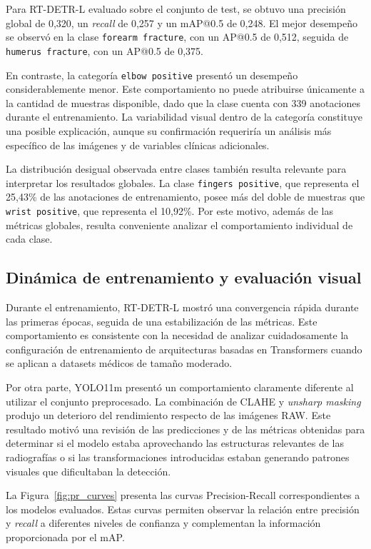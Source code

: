 \documentclass[conference]{IEEEtran}
\begin{document}
Para RT-DETR-L evaluado sobre el conjunto de test, se obtuvo una precisión global de 0,320, un \textit{recall} de 0,257 y un mAP@0.5 de 0,248. El mejor desempeño se observó en la clase \texttt{forearm fracture}, con un AP@0.5 de 0,512, seguida de \texttt{humerus fracture}, con un AP@0.5 de 0,375.

En contraste, la categoría \texttt{elbow positive} presentó un desempeño considerablemente menor. Este comportamiento no puede atribuirse únicamente a la cantidad de muestras disponible, dado que la clase cuenta con 339 anotaciones durante el entrenamiento. La variabilidad visual dentro de la categoría constituye una posible explicación, aunque su confirmación requeriría un análisis más específico de las imágenes y de variables clínicas adicionales.

La distribución desigual observada entre clases también resulta relevante para interpretar los resultados globales. La clase \texttt{fingers positive}, que representa el 25,43\% de las anotaciones de entrenamiento, posee más del doble de muestras que \texttt{wrist positive}, que representa el 10,92\%. Por este motivo, además de las métricas globales, resulta conveniente analizar el comportamiento individual de cada clase.


\subsection{Dinámica de entrenamiento y evaluación visual}

Durante el entrenamiento, RT-DETR-L mostró una convergencia rápida durante las primeras épocas, seguida de una estabilización de las métricas. Este comportamiento es consistente con la necesidad de analizar cuidadosamente la configuración de entrenamiento de arquitecturas basadas en Transformers cuando se aplican a datasets médicos de tamaño moderado.

Por otra parte, YOLO11m presentó un comportamiento claramente diferente al utilizar el conjunto preprocesado. La combinación de CLAHE y \textit{unsharp masking} produjo un deterioro del rendimiento respecto de las imágenes RAW. Este resultado motivó una revisión de las predicciones y de las métricas obtenidas para determinar si el modelo estaba aprovechando las estructuras relevantes de las radiografías o si las transformaciones introducidas estaban generando patrones visuales que dificultaban la detección.

La Figura~\ref{fig:pr_curves} presenta las curvas Precision-Recall correspondientes a los modelos evaluados. Estas curvas permiten observar la relación entre precisión y \textit{recall} a diferentes niveles de confianza y complementan la información proporcionada por el mAP.
\end{document}
